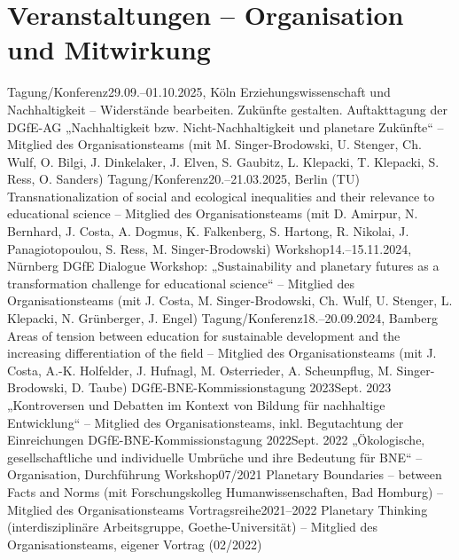 \section{Veranstaltungen – Organisation und Mitwirkung}
  \vspace{3pt}
  \resumeSubHeadingListStart
\resumeSubheading
      {Tagung/Konferenz}{29.09.–01.10.2025, Köln}
      {Erziehungswissenschaft und Nachhaltigkeit – Widerstände bearbeiten. Zukünfte gestalten. Auftakttagung der DGfE-AG „Nachhaltigkeit bzw. Nicht-Nachhaltigkeit und planetare Zukünfte“ – Mitglied des Organisationsteams (mit M. Singer-Brodowski, U. Stenger, Ch. Wulf, O. Bilgi, J. Dinkelaker, J. Elven, S. Gaubitz, L. Klepacki, T. Klepacki, S. Ress, O. Sanders)}{}
    \resumeSubheading
      {Tagung/Konferenz}{20.–21.03.2025, Berlin (TU)}
      {Transnationalization of social and ecological inequalities and their relevance to educational science – Mitglied des Organisationsteams (mit D. Amirpur, N. Bernhard, J. Costa, A. Dogmus, K. Falkenberg, S. Hartong, R. Nikolai, J. Panagiotopoulou, S. Ress, M. Singer-Brodowski)}{}
    \resumeSubheading
      {Workshop}{14.–15.11.2024, Nürnberg}
      {DGfE Dialogue Workshop: „Sustainability and planetary futures as a transformation challenge for educational science“ – Mitglied des Organisationsteams (mit J. Costa, M. Singer-Brodowski, Ch. Wulf, U. Stenger, L. Klepacki, N. Grünberger, J. Engel)}{}
    \resumeSubheading
      {Tagung/Konferenz}{18.–20.09.2024, Bamberg}
      {Areas of tension between education for sustainable development and the increasing differentiation of the field – Mitglied des Organisationsteams (mit J. Costa, A.-K. Holfelder, J. Hufnagl, M. Osterrieder, A. Scheunpflug, M. Singer-Brodowski, D. Taube)}{}
    \resumeSubheading
      {DGfE-BNE-Kommissionstagung 2023}{Sept. 2023}
      {„Kontroversen und Debatten im Kontext von Bildung für nachhaltige Entwicklung“ – Mitglied des Organisationsteams, inkl. Begutachtung der Einreichungen}{}
    \resumeSubheading
      {DGfE-BNE-Kommissionstagung 2022}{Sept. 2022}
      {„Ökologische, gesellschaftliche und individuelle Umbrüche und ihre Bedeutung für BNE“ – Organisation, Durchführung}{}
    \resumeSubheading
      {Workshop}{07/2021}
      {Planetary Boundaries – between Facts and Norms (mit Forschungskolleg Humanwissenschaften, Bad Homburg) – Mitglied des Organisationsteams}{}
    \resumeSubheading
      {Vortragsreihe}{2021–2022}
      {Planetary Thinking (interdisziplinäre Arbeitsgruppe, Goethe-Universität) – Mitglied des Organisationsteams, eigener Vortrag (02/2022)}{}
    \resumeSubheading
